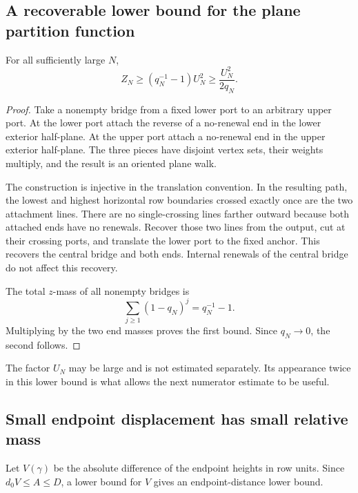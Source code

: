 \subsection{A recoverable lower bound for the plane partition function}
\begin{lemma}\label{lem:denominator}\label{R:thermal:denominator}
For all sufficiently large $N$,
\[
 Z_N\ge(q_N^{-1}-1)U_N^2\ge \frac{U_N^2}{2q_N}.
\]
\end{lemma}
\begin{proof}
Take a nonempty bridge from a fixed lower port to an arbitrary upper port. At the lower port attach the reverse of a no-renewal end in the lower exterior half-plane. At the upper port attach a no-renewal end in the upper exterior half-plane. The three pieces have disjoint vertex sets, their weights multiply, and the result is an oriented plane walk.

The construction is injective in the translation convention. In the resulting path, the lowest and highest horizontal row boundaries crossed exactly once are the two attachment lines. There are no single-crossing lines farther outward because both attached ends have no renewals. Recover those two lines from the output, cut at their crossing ports, and translate the lower port to the fixed anchor. This recovers the central bridge and both ends. Internal renewals of the central bridge do not affect this recovery.

The total $z$-mass of all nonempty bridges is
\[
 \sum_{j\ge1}(1-q_N)^j=q_N^{-1}-1.
\]
Multiplying by the two end masses proves the first bound. Since $q_N\to0$, the second follows.
\end{proof}
The factor $U_N$ may be large and is not estimated separately. Its appearance twice in this lower bound is what allows the next numerator estimate to be useful.

\subsection{Small endpoint displacement has small relative mass}
Let $V(\gamma)$ be the absolute difference of the endpoint heights in row units. Since $d_0V\le A\le D$, a lower bound for $V$ gives an endpoint-distance lower bound.

